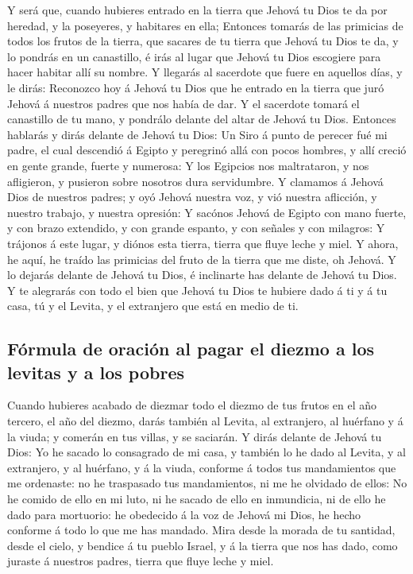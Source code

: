  Y será que, cuando hubieres entrado en la tierra que Jehová
tu Dios te da por heredad, y la poseyeres, y habitares en ella;
 Entonces tomarás de las primicias de todos los frutos de la
tierra, que sacares de tu tierra que Jehová tu Dios te da, y lo pondrás
en un canastillo, é irás al lugar que Jehová tu Dios escogiere para
hacer habitar allí su nombre.  Y llegarás al sacerdote que
fuere en aquellos días, y le dirás: Reconozco hoy á Jehová tu Dios que
he entrado en la tierra que juró Jehová á nuestros padres que nos había
de dar.  Y el sacerdote tomará el canastillo de tu mano, y
pondrálo delante del altar de Jehová tu Dios.  Entonces
hablarás y dirás delante de Jehová tu Dios: Un Siro á punto de perecer
fué mi padre, el cual descendió á Egipto y peregrinó allá con pocos
hombres, y allí creció en gente grande, fuerte y numerosa: 
Y los Egipcios nos maltrataron, y nos afligieron, y pusieron sobre
nosotros dura servidumbre.  Y clamamos á Jehová Dios de
nuestros padres; y oyó Jehová nuestra voz, y vió nuestra aflicción, y
nuestro trabajo, y nuestra opresión:  Y sacónos Jehová de
Egipto con mano fuerte, y con brazo extendido, y con grande espanto, y
con señales y con milagros:  Y trájonos á este lugar, y
diónos esta tierra, tierra que fluye leche y miel.  Y
ahora, he aquí, he traído las primicias del fruto de la tierra que me
diste, oh Jehová. Y lo dejarás delante de Jehová tu Dios, é inclinarte
has delante de Jehová tu Dios.  Y te alegrarás con todo el
bien que Jehová tu Dios te hubiere dado á ti y á tu casa, tú y el
Levita, y el extranjero que está en medio de ti.

\hypertarget{fuxf3rmula-de-oraciuxf3n-al-pagar-el-diezmo-a-los-levitas-y-a-los-pobres}{%
\subsection{Fórmula de oración al pagar el diezmo a los levitas y a los
pobres}\label{fuxf3rmula-de-oraciuxf3n-al-pagar-el-diezmo-a-los-levitas-y-a-los-pobres}}

 Cuando hubieres acabado de diezmar todo el diezmo de tus
frutos en el año tercero, el año del diezmo, darás también al Levita, al
extranjero, al huérfano y á la viuda; y comerán en tus villas, y se
saciarán.  Y dirás delante de Jehová tu Dios: Yo he sacado
lo consagrado de mi casa, y también lo he dado al Levita, y al
extranjero, y al huérfano, y á la viuda, conforme á todos tus
mandamientos que me ordenaste: no he traspasado tus mandamientos, ni me
he olvidado de ellos:  No he comido de ello en mi luto, ni
he sacado de ello en inmundicia, ni de ello he dado para mortuorio: he
obedecido á la voz de Jehová mi Dios, he hecho conforme á todo lo que me
has mandado.  Mira desde la morada de tu santidad, desde el
cielo, y bendice á tu pueblo Israel, y á la tierra que nos has dado,
como juraste á nuestros padres, tierra que fluye leche y miel.

